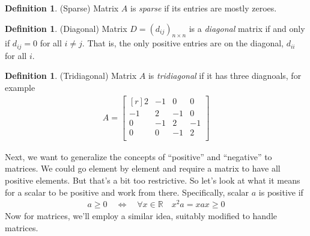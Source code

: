 \documentclass[12pt]{article}
\theoremstyle{plain}
\theoremstyle{definition}
\newtheorem{defn}[thm]{Definition}
\theoremstyle{remark}
\newcommand{\R}{\mathbb{R}}
\begin{document}
\begin{defn}{(Sparse)}
Matrix $A$ is \emph{sparse} if its entries are mostly zeroes.
\end{defn}

\begin{defn}{(Diagonal)}
Matrix $D=(d_{ij})_{n\times n}$ is a \emph{diagonal} matrix if and only
if $d_{ij}=0$ for all $i\neq j$. That is, the only positive entries are
on the diagonal, $d_{ii}$ for all $i$.
\end{defn}

\begin{defn}{(Tridiagonal)}
Matrix $A$ is \emph{tridiagonal} if it has three diagnoals, for example
\begin{align*}
  A =
  \begin{bmatrix}[r]
   2 & -1 &  0 &  0 \\
  -1 & 2 & -1 &  0 \\
   0 & -1 &  2 & -1 \\
   0 &  0 & -1 &  2 \\
  \end{bmatrix}
\end{align*}
\end{defn}

Next, we want to generalize the concepts of ``positive'' and
``negative'' to matrices. We could go element by element and require a
matrix to have all positive elements. But that's a bit too restrictive.
So let's look at what it means for a scalar to be positive and work from
there. Specifically, scalar $a$ is positive if
\begin{align*}
  a \geq 0
  \quad\Leftrightarrow\quad
  \forall x\in \R
  \quad
  x^2 a = x a x\geq 0
\end{align*}
Now for matrices, we'll employ a similar idea, suitably modified to
handle matrices.
\end{document}
